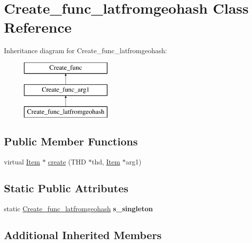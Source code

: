 \hypertarget{classCreate__func__latfromgeohash}{}\section{Create\+\_\+func\+\_\+latfromgeohash Class Reference}
\label{classCreate__func__latfromgeohash}
Inheritance diagram for Create\+\_\+func\+\_\+latfromgeohash\+:\begin{figure}[H]
\begin{center}
\leavevmode
\includegraphics[height=3.000000cm]{classCreate__func__latfromgeohash}
\end{center}
\end{figure}
\subsection*{Public Member Functions}
\begin{DoxyCompactItemize}
\item 
virtual \mbox{\hyperlink{classItem}{Item}} $\ast$ \mbox{\hyperlink{classCreate__func__latfromgeohash_a61830c8a1bcb8b067cab1034944b05b6}{create}} (T\+HD $\ast$thd, \mbox{\hyperlink{classItem}{Item}} $\ast$arg1)
\end{DoxyCompactItemize}
\subsection*{Static Public Attributes}
\begin{DoxyCompactItemize}
\item 
\mbox{\label{classCreate__func__latfromgeohash_aef8d4e32be7f294c22e03f12f09ed89b}} 
static \mbox{\hyperlink{classCreate__func__latfromgeohash}{Create\+\_\+func\+\_\+latfromgeohash}} {\bfseries s\+\_\+singleton}
\end{DoxyCompactItemize}
\subsection*{Additional Inherited Members}


